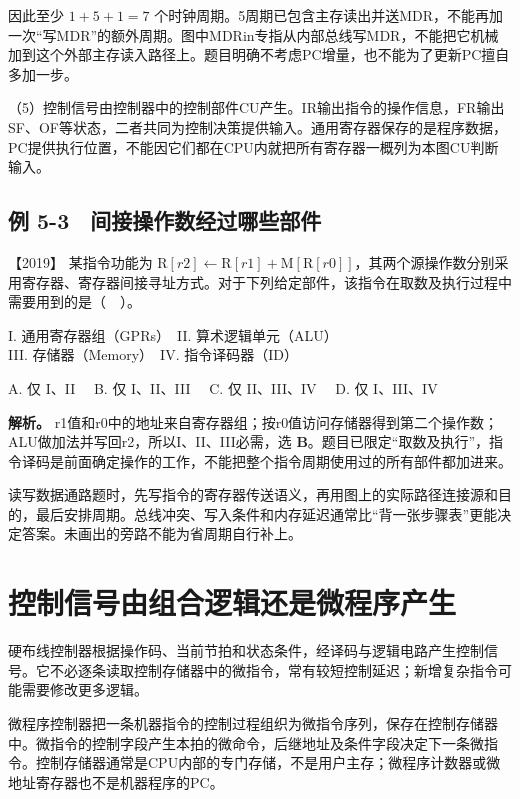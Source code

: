 因此至少 \(1+5+1=7\) 个时钟周期。5周期已包含主存读出并送MDR，不能再加一次``写MDR''的额外周期。图中MDRin专指从内部总线写MDR，不能把它机械加到这个外部主存读入路径上。题目明确不考虑PC增量，也不能为了更新PC擅自多加一步。

（5）控制信号由控制器中的控制部件CU产生。IR输出指令的操作信息，FR输出SF、OF等状态，二者共同为控制决策提供输入。通用寄存器保存的是程序数据，PC提供执行位置，不能因它们都在CPU内就把所有寄存器一概列为本图CU判断输入。

\subsection{例 5-3　间接操作数经过哪些部件}\label{co-ex5-3}

\noindent{}【2019】 某指令功能为 \(\mathrm R[r2]\leftarrow\mathrm R[r1]+\mathrm M[\mathrm R[r0]]\)，其两个源操作数分别采用寄存器、寄存器间接寻址方式。对于下列给定部件，该指令在取数及执行过程中需要用到的是（　）。

I. 通用寄存器组（GPRs）　II. 算术逻辑单元（ALU）\\
III. 存储器（Memory）　IV. 指令译码器（ID）

A. 仅 I、II　 B. 仅 I、II、III　 C. 仅 II、III、IV　 D. 仅 I、III、IV


\textbf{解析。} r1值和r0中的地址来自寄存器组；按r0值访问存储器得到第二个操作数；ALU做加法并写回r2，所以I、II、III必需，选 \textbf{B}。题目已限定``取数及执行''，指令译码是前面确定操作的工作，不能把整个指令周期使用过的所有部件都加进来。

读写数据通路题时，先写指令的寄存器传送语义，再用图上的实际路径连接源和目的，最后安排周期。总线冲突、写入条件和内存延迟通常比``背一张步骤表''更能决定答案。未画出的旁路不能为省周期自行补上。

\section{控制信号由组合逻辑还是微程序产生}\label{co-05-04}

硬布线控制器根据操作码、当前节拍和状态条件，经译码与逻辑电路产生控制信号。它不必逐条读取控制存储器中的微指令，常有较短控制延迟；新增复杂指令可能需要修改更多逻辑。

微程序控制器把一条机器指令的控制过程组织为微指令序列，保存在控制存储器中。微指令的控制字段产生本拍的微命令，后继地址及条件字段决定下一条微指令。控制存储器通常是CPU内部的专门存储，不是用户主存；微程序计数器或微地址寄存器也不是机器程序的PC。

